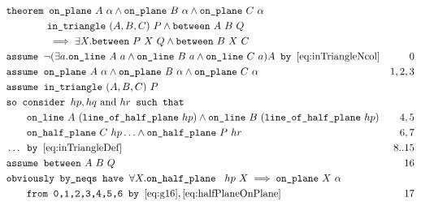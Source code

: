 \begin{boxedfigure}
\small
\begin{align*}
&\texttt{theorem }\code{on\_plane}\ A\ \alpha \wedge \code{on\_plane}\ B\ \alpha \wedge \code{on\_plane}\ C\ \alpha\\
&\qquad\qquad\code{in\_triangle}\ (A,B,C)\ P \wedge \between{A}{B}{Q}\\
&\qquad\qquad\implies\exists X. \between{P}{X}{Q} \wedge \between{B}{X}{C}\\
&\texttt{assume } \Triangle{a}{A}{B}{C}A \texttt{ by } \eqref{eq:inTriangleNcol}&0\\
&\texttt{assume } \code{on\_plane}\ A\ \alpha \wedge \code{on\_plane}\ B\ \alpha \wedge \code{on\_plane}\ C\ \alpha&1,2,3\\
  &\texttt{assume } \code{in\_triangle}\ (A,B,C)\ P\\
  &\texttt{so consider } hp, hq \text{ and } hr \texttt{ such that }\\
&\qquad \code{on\_line}\ A\ (\code{line\_of\_half\_plane}\ hp) \wedge \code{on\_line}\ B\ (\code{line\_of\_half\_plane}\ hp)& 4,5\\ 
&\qquad \code{on\_half\_plane}\ C\ hp\ldots \wedge \code{on\_half\_plane}\ P\ hr & 6,7\\
&\ldots \texttt{ by } \eqref{eq:inTriangleDef} & 8..15\\
&\texttt{assume } \between{A}{B}{Q} & 16\\
&\texttt{obviously by\_neqs have } \forall X. \code{on\_half\_plane }\ hp\ X \implies \code{on\_plane}\ X\ \alpha\\ &\qquad\texttt{from 0,1,2,3,4,5,6 by } \eqref{eq:g16}, \eqref{eq:halfPlaneOnPlane}& 17\\

\end{align*}
\end{boxedfigure}
